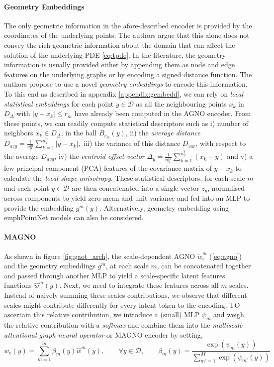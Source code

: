 \documentclass[reqno,10pt]{amsart}
\theoremstyle{plain}
\theoremstyle{definition}
\newcommand{\cal}[1]{\mathcal{#1}}
\begin{document}
\paragraph{\bf Geometry Embeddings}
The only geometric information in the afore-described encoder is provided by the coordinates of the underlying points. The authors argue that this alone does not convey the rich geometric information about the domain that can affect the solution of the underlying PDE \ref{eq:tpde}. In the literature, the geometry information is usually provided either by appending them as node and edge features on the underlying graphs or by encoding a signed distance function. The authors propose to use a novel {\it geometry embeddings} to encode this information. To this end as described in appendix \ref{appendix:gembedd}, we can rely on {\it local statistical embeddings} for each point $y \in \cal D$ as all the neighbouring points $x_k$ in $D_\Delta$ with $|y-x_k| \leq r_m$ have already been computed in the AGNO encoder. From these points, we can readily compute statistical descriptors such as i) number of neighbors $x_k \in D_\Delta$, in the ball $B_{r_m}(y)$, ii) the {\it average distance} $D_{avg} = \frac{1}{n_y^m} \sum_{k=1}^{n_y^m} |y-x_k|,$ iii) the variance of this distance $D_{var}$, with respect to the average $D_{avg}$, iv) the {\it centroid offset vector} $\Delta_y = \frac{1}{n_y^m} \sum_{k=1}^{n_x^y}(x_k-y)$ and v) a few principal component (PCA) features of the covariance matrix of $y-x_k$ to calculate the {\it local shape anisotropy}. These statistical descriptors, for each scale $m$ and each point $y \in \cal D$ are then concatenated into a single vector $z_y$, normalised across components to yield zero mean and unit variance and fed into an MLP to provide the embedding $g^m(y)$. Alternatively, geometry embedding using emphPointNet models \cite{RC2017} can also be considered.

\paragraph{\bf MAGNO} 
As shown in figure \ref{fig:gaot_arch}, the scale-dependent AGNO $\tilde{w}^m_e$ (\ref{eq:agno}) and the geometry embeddings $g^m$, at each scale $m$, can be concatenated together and passed through another MLP to yield a scale-specific latent features functions $\hat{w}^m(y)$. Next, we need to integrate these features across all $m$ scales. Instead of naively summing these scales contributions, we observe that different scales might contribute differently for every latent token to the encoding. TO ascertain this relative contribution, we introduce a (small) MLP $\psi_m$ and weigh the relative contribution with a {\it softmax} and combine them into the {\it multiscale attentional graph neural operator} or MAGNO encoder by setting,
\begin{equation}\label{eq:attenweights}
    w_e(y) = \sum_{m=1}^{\bar{m}} \beta_m(y) \hat{w}^m(y), \qquad \forall y \in \cal D, \qquad \beta_m(y) = \frac{\exp(\psi_m(y))}{\sum_{m'=1}^{M}\exp(\psi_{m'}(y))}
\end{equation}
\end{document}
